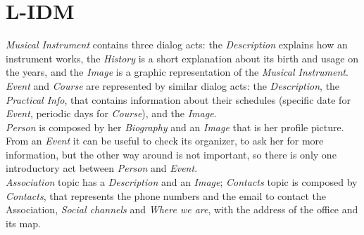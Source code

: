 \documentclass[../../DD.tex]{subfiles}
\begin{document}
\section{L-IDM}
	\textit{Musical Instrument} contains three dialog acts: the \textit{Description} explains how an instrument works, the \textit{History} is a short explanation about its birth and usage on the years, and the \textit{Image} is a graphic representation of the \textit{Musical Instrument}.\\
	\textit{Event} and \textit{Course} are represented by similar dialog acts: the \textit{Description}, the \textit{Practical Info}, that contains information about their schedules (specific date for \textit{Event}, periodic days for \textit{Course}), and the \textit{Image}.\\
	\textit{Person} is composed by her \textit{Biography} and an \textit{Image} that is her profile picture. From an \textit{Event} it can be useful to check its organizer, to ask her for more information, but the other way around is not important, so there is only one introductory act between \textit{Person} and \textit{Event}.\\
	\textit{Association} topic has a \textit{Description} and an \textit{Image}; \textit{Contacts} topic is composed by \textit{Contacts}, that represents the phone numbers and the email to contact the Association, \textit{Social channels} and \textit{Where we are}, with the address of the office and its map.
	\newline
\end{document}
